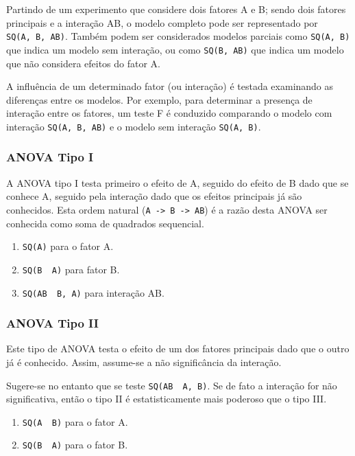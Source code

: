 \documentclass[
]{article}
\providecommand{\tightlist}{%
  \setlength{\itemsep}{0pt}\setlength{\parskip}{0pt}}
\begin{document}
Partindo de um experimento que considere dois fatores A e B; sendo dois fatores principais e a interação AB, o modelo completo pode ser representado por \texttt{SQ(A,\ B,\ AB)}. Também podem ser considerados modelos parciais como \texttt{SQ(A,\ B)} que indica um modelo sem interação, ou como \texttt{SQ(B,\ AB)} que indica um modelo que não considera efeitos do fator A.

A influência de um determinado fator (ou interação) é testada examinando as diferenças entre os modelos. Por exemplo, para determinar a presença de interação entre os fatores, um teste F é conduzido comparando o modelo com interação \texttt{SQ(A,\ B,\ AB)} e o modelo sem interação \texttt{SQ(A,\ B)}.

\hypertarget{anova-tipo-i}{%
\subsubsection{ANOVA Tipo I}\label{anova-tipo-i}}

A ANOVA tipo I testa primeiro o efeito de A, seguido do efeito de B dado que se conhece A, seguido pela interação dado que os efeitos principais já são conhecidos. Esta ordem natural (\texttt{A\ -\textgreater{}\ B\ -\textgreater{}\ AB}) é a razão desta ANOVA ser conhecida como soma de quadrados sequencial.

\begin{enumerate}
\def\labelenumi{\arabic{enumi}.}
\tightlist
\item
  \texttt{SQ(A)} para o fator A.
\item
  \texttt{SQ(B\ \textbar{}\ A)} para fator B.
\item
  \texttt{SQ(AB\ \textbar{}\ B,\ A)} para interação AB.
\end{enumerate}

\hypertarget{anova-tipo-ii}{%
\subsubsection{ANOVA Tipo II}\label{anova-tipo-ii}}

Este tipo de ANOVA testa o efeito de um dos fatores principais dado que o outro já é conhecido. Assim, assume-se a não significância da interação.

Sugere-se no entanto que se teste \texttt{SQ(AB\ \textbar{}\ A,\ B)}. Se de fato a interação for não significativa, então o tipo II é estatisticamente mais poderoso que o tipo III.

\begin{enumerate}
\def\labelenumi{\arabic{enumi}.}
\tightlist
\item
  \texttt{SQ(A\ \textbar{}\ B)} para o fator A.
\item
  \texttt{SQ(B\ \textbar{}\ A)} para o fator B.
\end{enumerate}
\end{document}
